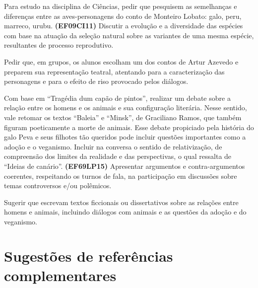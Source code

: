 Para estudo na disciplina de Ciências, pedir que pesquisem as
semelhanças e diferenças entre as aves-personagens do conto de Monteiro
Lobato: galo, peru, marreco, urubu. \textbf{(EF09CI11)} Discutir a
evolução e a diversidade das espécies com base na atuação da seleção
natural sobre as variantes de uma mesma espécie, resultantes de processo
reprodutivo.

Pedir que, em grupos, os alunos escolham um dos contos de Artur Azevedo
e preparem sua representação teatral, atentando para a caracterização
das personagens e para o efeito de riso provocado pelos diálogos.

Com base em ``Tragédia dum capão de pintos'', realizar um debate sobre a
relação entre os homens e os animais e sua configuração literária. Nesse
sentido, vale retomar os textos ``Baleia'' e ``Minsk'', de Graciliano
Ramos, que também figuram poeticamente a morte de animais. Esse debate
propiciado pela história do galo Peva e seus filhotes tão queridos pode
incluir questões importantes como a adoção e o veganismo. Incluir na
conversa o sentido de relativização, de compreensão dos limites da
realidade e das perspectivas, o qual ressalta de ``Ideias de canário''.
\textbf{(EF69LP15)} Apresentar argumentos e contra-argumentos coerentes,
respeitando os turnos de fala, na participação em discussões sobre temas
controversos e/ou polêmicos.

Sugerir que escrevam textos ficcionais ou dissertativos sobre as
relações entre homens e animais, incluindo diálogos com animais e as
questões da adoção e do veganismo. 

\chapter{Sugestões de referências complementares}

